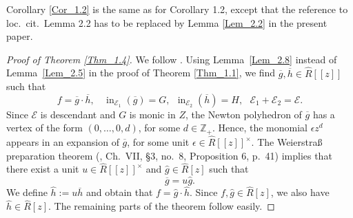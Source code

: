 \documentclass[11pt]{amsart}
\theoremstyle{plain}
\theoremstyle{definition}
\numberwithin{equation}{section}
\newcommand{\ini}{\operatorname{in}}
\newcommand{\ZZ}{{\mathbb Z}}
\newcommand{\cE}{\mathcal{E}}
\renewcommand{\(}{(\!(}
\renewcommand{\)}{)\!)}
\begin{document}
\smallskip


Corollary \ref{Cor_1.2} is the same as for \cite{GH} Corollary 1.2, %
except that the reference to loc.~cit.~Lemma 2.2 has to be replaced by Lemma \ref{Lem_2.2} in the present paper. 

\smallskip

\begin{proof}[Proof of Theorem \ref{Thm_1.4}]
	We follow \cite{GH}.
	Using Lemma~\ref{Lem_2.8} instead of Lemma~\ref{Lem_2.5}
	in the proof of Theorem \ref{Thm_1.1},
	we find $ \overline g, \overline h \in \widehat{R}[[z]] $ 
	such that 
	\[
		f = \overline g \cdot \overline h,
		\ \ \ \
		\ini_{\cE_1} (\overline g) = G,
		\ \
		\ini_{\cE_2} (\overline h) = H,
		\ \ \
		\cE_1 + \cE_2 = \cE. 
	\]
	Since $ \cE $ is descendant and $ G $ is monic in $ Z $,
	the Newton polyhedron of $ \overline g $ has a vertex of the form $ (0, \ldots, 0, d) $, for some $ d \in \ZZ_+ $.
	Hence, the monomial $ \epsilon z^d $ appears 
	in an expansion of $ \overline g $,
	for some unit $ \epsilon \in \widehat{R}[[z]]^\times $.
	The Weierstra{\ss} preparation theorem 
	(\cite{Bourbaki}, Ch.~VII, \S3, no.~8, Proposition 6, p.~41)
	implies that
	there exist a unit $ u \in \widehat{R}[[z]]^\times $ and $ \widehat g \in \widehat R [z] $ such that
	\[
		\overline g = u \widehat g.
	\]
	We define $ \widehat h := u \overline h $ and obtain that
	$ f = \widehat g \cdot \widehat h $.
	Since $ f, \widehat g \in \widehat R [z] $, we also have 
	$ \widehat h \in \widehat R[z] $.
	The remaining parts of the theorem follow easily.
\end{proof} 





\smallskip 
\end{document}
